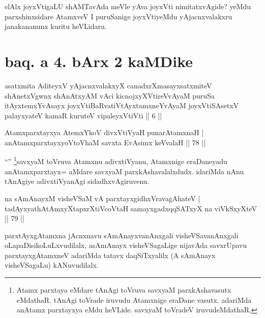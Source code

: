 \begin{artha}
elAlx joyxVtigaLU shAMTavAda meVle yAva joyxVti nimitatxvAgide? yeMdu parxshinxsidare AtamxveV I puruSanige joyxVtiyeMdu yAjacnxvalakxru janakananunx kuritu heVLidaru.
\end{artha}

\section*{baq. a 4. bArx 2 kaMDike}

\begin{shl}
asatxmita AditeyxV yAjacnxvalakxyX canadxrXmasayxsatxmiteV shAnetxV\s gwnx shAnAtxyAM vAci kicnojxyXVtireVvAyaM puruSa itAyxtemxYvAsayx joyxVtiBaRvatiVtAyxtamxneYvAyaM joyxVtiSAsetxV palayxyateV kamaR kuruteV vipaleyxVtiVti || 6 ||
\end{shl}



\begin{shl}
Atamxparxtayxya AtemxYkoV divxVtiVyaH punarAtamxnaH | \\
anAtamxparxtayxyoV\s toV\s haM savxta EvAsimx keVvalaH \hfill||  78 ||  
\end{shl}

\begin{artha}
``\stext'' \footnote{Atamx parxtaya eMdare tAnAgi toVruva savxyaM parxkAshavasutx eMdathaR. tAnAgi toVrade iruvudu Atamxnige eraDane vasutx. adariMda anAtamx parxtayxya eMdu heVLide. savxyaM toVradeV iruvudeMdathaR,}savxyaM toVruva Atamxnu adivxtiVyanu, Atamxnige eraDaneyadu anAtamxparxtayx= aMdare savxyaM parxkAshavalalxdudx. idariMda nAnu tAnAgiye adivxtiVyanAgi sidadhxvAgiruvenu.
\end{artha}


\begin{shl}
na sAmAnayxM visheVSaM vA parxtayxgidhxVravagAhateV | \\
tadAyxyathAtAmxyXtapxrXtiVcoV\s taH samayxgadxqqSATxyX na viVkSxyXteV \hfill||  79 ||  
\end{shl}

\begin{artha}
parxtAyxgAtamxna jAcnxnavu sAmAnayxvanAnxgali visheVSavanAnxgali oLapaDisikoLuLxvudilalx, asAmAnayx visheVSagaLige nijavAda savxrUpavu parxtayxgAtamxneV adariMda tatavx daqSiTxyalilx (A sAmAnayx visheVSagaLu) kANuvudilalx.
\end{artha}

